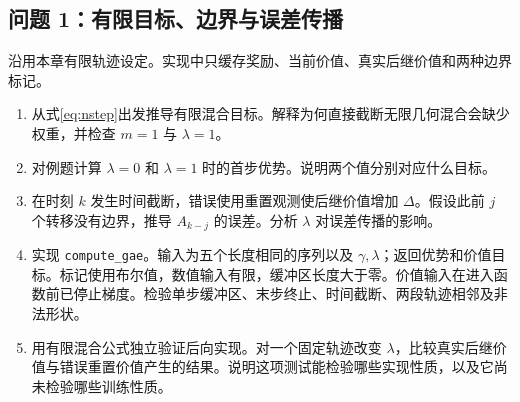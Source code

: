 \subsection*{问题 1：有限目标、边界与误差传播}\label{prob:gae}
沿用本章有限轨迹设定。实现中只缓存奖励、当前价值、真实后继价值和两种边界标记。
\begin{enumerate}
\item\label{part:gae-a} 从式\eqref{eq:nstep}出发推导有限混合目标。解释为何直接截断无限几何混合会缺少权重，并检查 $m=1$ 与 $\lambda=1$。
\item\label{part:gae-b} 对例题计算 $\lambda=0$ 和 $\lambda=1$ 时的首步优势。说明两个值分别对应什么目标。
\item\label{part:gae-c} 在时刻 $k$ 发生时间截断，错误使用重置观测使后继价值增加 $\Delta$。假设此前 $j$ 个转移没有边界，推导 $A_{k-j}$ 的误差。分析 $\lambda$ 对误差传播的影响。
\item\label{part:gae-d} 实现 \texttt{compute\_gae}。输入为五个长度相同的序列以及 $\gamma,\lambda$；返回优势和价值目标。标记使用布尔值，数值输入有限，缓冲区长度大于零。价值输入在进入函数前已停止梯度。检验单步缓冲区、末步终止、时间截断、两段轨迹相邻及非法形状。
\item\label{part:gae-e} 用有限混合公式独立验证后向实现。对一个固定轨迹改变 $\lambda$，比较真实后继价值与错误重置价值产生的结果。说明这项测试能检验哪些实现性质，以及它尚未检验哪些训练性质。
\end{enumerate}
